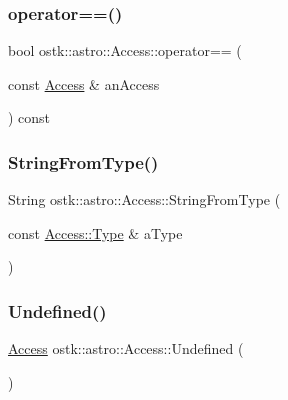 \subsubsection{\texorpdfstring{operator==()}{operator==()}}
{\footnotesize\ttfamily bool ostk\+::astro\+::\+Access\+::operator== (\begin{DoxyParamCaption}\item[{const \hyperlink{classostk_1_1astro_1_1_access}{Access} \&}]{an\+Access }\end{DoxyParamCaption}) const}

\mbox{\label{classostk_1_1astro_1_1_access_ada64e6a55fe3505b548bdb2651f122e3}} 
\subsubsection{\texorpdfstring{String\+From\+Type()}{StringFromType()}}
{\footnotesize\ttfamily String ostk\+::astro\+::\+Access\+::\+String\+From\+Type (\begin{DoxyParamCaption}\item[{const \hyperlink{classostk_1_1astro_1_1_access_aac00b1a6ead7db92eba5b71e43235c93}{Access\+::\+Type} \&}]{a\+Type }\end{DoxyParamCaption})\hspace{0.3cm}{\ttfamily [static]}}

\mbox{\label{classostk_1_1astro_1_1_access_aa7770be15907d9dabc3ae9a9490e9bad}} 
\subsubsection{\texorpdfstring{Undefined()}{Undefined()}}
{\footnotesize\ttfamily \hyperlink{classostk_1_1astro_1_1_access}{Access} ostk\+::astro\+::\+Access\+::\+Undefined (\begin{DoxyParamCaption}{ }\end{DoxyParamCaption})\hspace{0.3cm}{\ttfamily [static]}}



